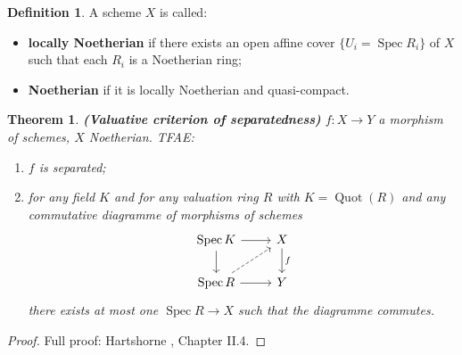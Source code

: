 \documentclass[12pt]{article}
\DeclareMathOperator{\Spec}{Spec}
\DeclareMathOperator{\Quot}{Quot}
\newtheorem*{theorem}{Theorem}
\theoremstyle{definition}
\newtheorem*{definition}{Definition}
\begin{document}
\begin{definition}
A scheme $X$ is called:
\begin{itemize}
\item \textbf{locally Noetherian} if there exists an open affine cover $\{U_i=\Spec R_i\}$ of $X$ such that each $R_i$ is a Noetherian ring;
\item \textbf{Noetherian} if it is locally Noetherian and quasi-compact.
\end{itemize}
\end{definition}

\begin{theorem}
\emph{\textbf{(Valuative criterion of separatedness)}} $f:X\rightarrow Y$ a morphism of schemes, $X$ Noetherian. TFAE:
\begin{enumerate}[label=\arabic*)]
\item\label{separated_morphism} $f$ is separated;
\item\label{uniqueness_limit} for any field $K$ and for any valuation ring $R$ with $K=\Quot(R)$ and any commutative diagramme of morphisms of schemes
\[
\begin{tikzcd}
\Spec K\arrow[r]\arrow[d]&X\arrow[d,"f"]\\
\Spec R\arrow[r]\arrow[ru,dashed]&Y
\end{tikzcd}
\]
there exists at most one $\Spec R\rightarrow X$ such that the diagramme commutes.
\end{enumerate}
\end{theorem}

\begin{proof}
Full proof: Hartshorne \cite{hartshorne2013algebraic}, Chapter II.4.
\end{proof}
\end{document}
